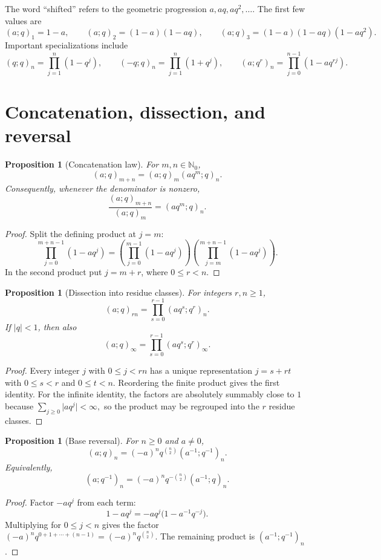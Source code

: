 \documentclass[11pt,oneside,openany]{book}
\newtheorem{proposition}[theorem]{Proposition}
\theoremstyle{definition}
\theoremstyle{remark}
\newcommand{\N}{\mathbb N}
\newcommand{\abs}[1]{\lvert #1\rvert}
\begin{document}
The word ``shifted'' refers to the geometric progression $a,aq,aq^2,\ldots$.  The first few values are
\[
 (a;q)_1=1-a,
 \qquad
 (a;q)_2=(1-a)(1-aq),
 \qquad
 (a;q)_3=(1-a)(1-aq)(1-aq^2).
\]
Important specializations include
\[
 (q;q)_n=\prod_{j=1}^n(1-q^j),
 \qquad
 (-q;q)_n=\prod_{j=1}^n(1+q^j),
 \qquad
 (a;q^r)_n=\prod_{j=0}^{n-1}(1-aq^{rj}).
\]

\section{Concatenation, dissection, and reversal}

\begin{proposition}[Concatenation law]\label{prop:concat}
For $m,n\in\N_0$,
\[
 (a;q)_{m+n}=(a;q)_m(aq^m;q)_n.
\]
Consequently, whenever the denominator is nonzero,
\[
 \frac{(a;q)_{m+n}}{(a;q)_m}=(aq^m;q)_n.
\]
\end{proposition}

\begin{proof}
Split the defining product at $j=m$:
\[
 \prod_{j=0}^{m+n-1}(1-aq^j)
 =\left(\prod_{j=0}^{m-1}(1-aq^j)\right)
  \left(\prod_{j=m}^{m+n-1}(1-aq^j)\right).
\]
In the second product put $j=m+r$, where $0\le r<n$.
\end{proof}

\begin{proposition}[Dissection into residue classes]\label{prop:dissection}
For integers $r,n\ge1$,
\[
 (a;q)_{rn}=\prod_{s=0}^{r-1}(aq^s;q^r)_n.
\]
If $\abs q<1$, then also
\[
 (a;q)_\infty=\prod_{s=0}^{r-1}(aq^s;q^r)_\infty.
\]
\end{proposition}

\begin{proof}
Every integer $j$ with $0\le j<rn$ has a unique representation $j=s+rt$ with $0\le s<r$ and $0\le t<n$.  Reordering the finite product gives the first identity.  For the infinite identity, the factors are absolutely summably close to $1$ because
\(
 \sum_{j\ge0}\abs{a q^j}<\infty,
\)
so the product may be regrouped into the $r$ residue classes.
\end{proof}

\begin{proposition}[Base reversal]\label{prop:base-reversal}
For $n\ge0$ and $a\ne0$,
\[
 (a;q)_n=(-a)^n q^{\binom n2}(a^{-1};q^{-1})_n.
\]
Equivalently,
\[
 (a;q^{-1})_n=(-a)^nq^{-\binom n2}(a^{-1};q)_n.
\]
\end{proposition}

\begin{proof}
Factor $-aq^j$ from each term:
\[
 1-aq^j=-aq^j\bigl(1-a^{-1}q^{-j}\bigr).
\]
Multiplying for $0\le j<n$ gives the factor
\(
 (-a)^nq^{0+1+\cdots+(n-1)}=(-a)^nq^{\binom n2}.
\)
The remaining product is $(a^{-1};q^{-1})_n$.
\end{proof}
\end{document}
